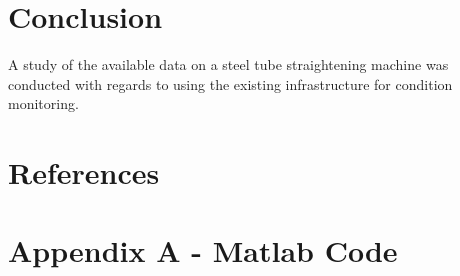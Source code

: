 \documentclass{article}
\begin{document}
\clearpage

\section{Conclusion}
A study of the available data on a steel tube straightening machine was conducted with regards to using the existing infrastructure for condition monitoring.
\newpage

\section{References} 
\printbibliography[heading=none] 
\clearpage  
\section{Appendix A - Matlab Code}
\UseRawInputEncoding


%
\end{document}

